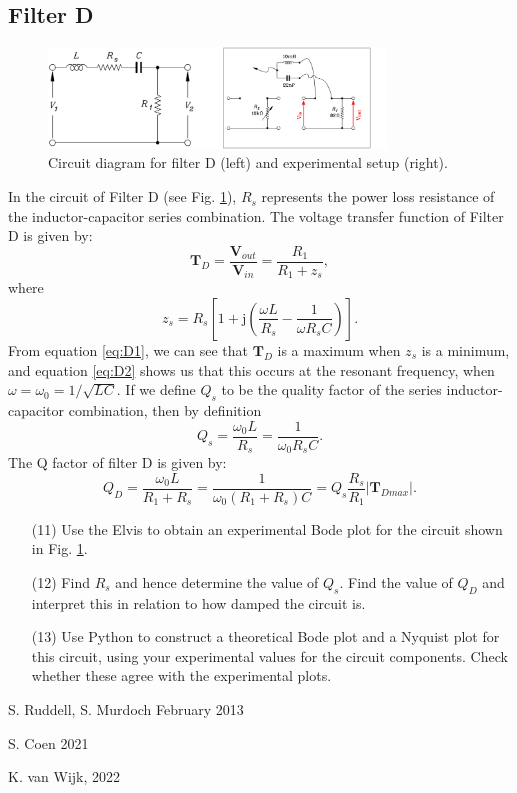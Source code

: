 \documentclass{article}
\begin{document}
\subsection{Filter D}
\begin{figure}[ht]
  \centering
  \includegraphics[width=0.8\textwidth]{images/filterD.png}
  \caption{Circuit diagram for filter D (left) and experimental setup (right).}
  \label{fig:lc2}
\end{figure}
In the circuit of Filter D (see Fig. \ref{fig:lc2}), $R_s$ represents
the power loss resistance of the inductor-capacitor series
combination. The voltage transfer function of Filter D is given by:
\begin{equation}
  \mathbf{T}_D=\frac{\mathbf{V}_{out}}{\mathbf{V}_{in}}=\frac{R_1}{R_1+z_s},
  \label{eq:D1}
\end{equation}
where
\begin{equation}
  z_s=R_s\left[1+\mathrm{j}\left(\frac{\omega L}{R_s}-\frac{1}{\omega R_s C}\right)\right].
  \label{eq:D2}
\end{equation}
From equation \ref{eq:D1}, we can see that $\mathbf{T}_D$ is a maximum
when $z_s$ is a minimum, and equation \ref{eq:D2} shows us that this
occurs at the resonant frequency, when $\omega=\omega_0
=1/\sqrt{LC}$. If we define $Q_s$ to be the quality factor of the
series inductor-capacitor combination, then by definition
\begin{equation}
  Q_s =\frac{\omega_0 L}{R_s}=\frac{1}{\omega_0 R_s C}.
\end{equation}
The Q factor of filter D is given by:
\begin{equation}
  Q_D=\frac{\omega_0 L}{R_1 + R_s}=\frac{1}{\omega_0(R_1+R_s)C}=Q_s\frac{R_s}{R_1}|\mathbf{T}_{Dmax}|.
\end{equation}

\begin{enumerate}
\item[(11)] Use the Elvis to obtain an experimental Bode plot for the
  circuit shown in Fig. \ref{fig:lc2}.

\item[(12)] Find $R_s$ and hence determine the value of $Q_s$. Find
  the value of $Q_D$ and interpret this in relation to how damped the
  circuit is.

\item[(13)] Use Python to construct a theoretical Bode plot and a
  Nyquist plot for this circuit, using your experimental values for
  the circuit components. Check whether these agree with the
  experimental plots.

\end{enumerate}


S. Ruddell, S. Murdoch February 2013

S. Coen 2021

K. van Wijk, 2022
\end{document}
